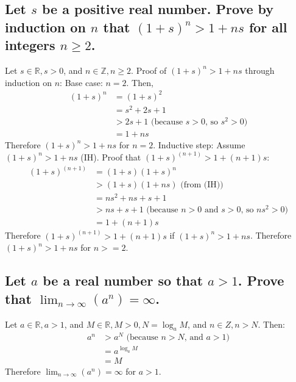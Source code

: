 \documentclass[10pt, letterpaper, titlepage]{article}
\newcommand{\0}{\varnothing}
\newcommand{\Z}{\mathbb{Z}}
\newcommand{\R}{\mathbb{R}}
\newcommand{\lntinf}{\lim_{n \to \infty}}
\newcommand{\1}{\{ 1 \}}
\newcommand{\2}{\{ (1,1) \}}
\begin{document}
        \subsection{Let $s$ be a positive real number. Prove by induction on $n$ that $(1+s)^n > 1 + ns$ for all integers $n \geq 2$.}
            Let $s \in \R, s > 0$, and $n \in \Z, n \ge 2$.
            Proof of $(1+s)^n > 1 + ns$ through induction on $n$:
            Base case: $n = 2$.
            Then,
            \begin{align*}
                (1+s)^n &= (1+s)^2 \\
                &= s^2 + 2s +1\\
                &> 2s + 1 \text{ (because $s > 0$, so $s^2 >0$)}\\
                &= 1 + ns
            \end{align*}
            Therefore $(1+s)^n > 1 + ns$ for $n = 2$.
            Inductive step: Assume $(1+s)^n > 1 + ns$ (IH).
            Proof that $(1+s)^{(n+1)} > 1 + (n+1)s$:
            \begin{align*}
                (1+s)^{(n+1)} &= (1+s)(1+s)^n\\
                &> (1+s)(1+ns) \text{ (from (IH))}\\
                &= ns^2 + ns + s + 1\\
                &> ns + s + 1 \text{ (because $n > 0$ and $s > 0$, so $ns^2 >0$)}\\
                &= 1 + (n+1)s
            \end{align*}
            Therefore $(1+s)^{(n+1)} > 1 + (n+1)s$ if $(1+s)^n > 1 + ns$.
            Therefore $(1+s)^n > 1 + ns$ for $n >= 2$.

        \subsection{Let $a$ be a real number so that $a > 1$. Prove that $\lntinf (a^n) = \infty$.}
            Let $a \in \R, a > 1$, and $M \in \R, M > 0, N = \log_aM$, and $n \in Z, n > N$.
            Then:
            \begin{align*}
                a^n &>a^N \text{ (because $n > N$, and $a > 1$)}\\
                &= a^{\log_a{M}}\\
                &= M
            \end{align*}
            Therefore $\lntinf (a^n) = \infty$ for $a > 1$.

        \newpage
\end{document}
